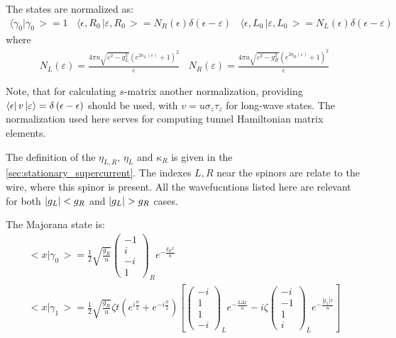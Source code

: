   The states are normalized as:
\begin{gather}
	\big\langle\gamma_{0}\big|\gamma_{0}\,\big>=1
	~~~~
	\big\langle\epsilon,R_{0}\,\big|\varepsilon,R_{0}\,\big>=N_{R}\left(\epsilon\right)\delta\left(\epsilon-\varepsilon\right)
	~~~~
	\big\langle\epsilon,L_{0}\,\big|\varepsilon,L_{0}\,\big>=N_{L}\left(\epsilon\right)\delta\left(\epsilon-\varepsilon\right)
\end{gather}
where
\begin{gather}
\label{N_L_N_R_definition}
	N_{L}\left(\varepsilon\right)=\frac{4\pi u\sqrt{\varepsilon^{2}-g_{L}^{2}}\left(e^{2\ensuremath{\kappa_{L}\left(\varepsilon\right)}}+1\right)^{2}}{\varepsilon}
	~~~~
	N_{R}\left(\varepsilon\right)=\frac{4\pi u\sqrt{\varepsilon^{2}-g_{R}^{2}}\left(e^{2\eta_{R}\left(\varepsilon\right)}+1\right)^{2}}{\varepsilon}
\end{gather}

Note, that for calculating $ s $-matrix another normalization, providing $ \bra{\epsilon} v \ket{\varepsilon} = \delta\left(\epsilon-\epsilon\right) $ should be used, with $ v=u\sigma_z\tau_z $ for long-wave states. The normalization used here serves for computing tunnel Hamiltonian matrix elements.

The definition of the $ \eta_{L,R} $, $ \eta_L $ and $ \kappa_R $ is given in the \ref{sec:stationary_supercurrent}. The indexes $ L,R $  near the spinors are relate to the wire, where this spinor is present. All the wavefucntions listed here  are relevant for both $ \left|g_{L}\right|<g_{R} $ and $ \abs{g_{L}}>g_{R} $ cases.

The Majorana state is:
\begin{gather}
	\big<x\big|\gamma_{0}\,\big>=\frac{1}{2}\sqrt{\frac{g_{R}}{u}}\begin{pmatrix}-1\\
	i\\
	-i\\
	1
	\end{pmatrix}_{R}e^{-\frac{g_{R}x}{u}}
	\\
	\big<x\big|\gamma_{1}\,\big>=\frac{1}{2}\sqrt{\frac{g_{R}}{u}}\zeta t\left(e^{i\frac{\phi}{2}}+e^{-i\frac{\phi}{2}}\right)\left[\begin{pmatrix}-i\\
	1\\
	1\\
	-i
	\end{pmatrix}_{L}e^{-\frac{2\Delta x}{u}}-i\zeta\begin{pmatrix}-i\\
	-1\\
	1\\
	i
	\end{pmatrix}_{L}e^{-\frac{\left|g_{L}\right|x}{u}}\right]
\end{gather}

